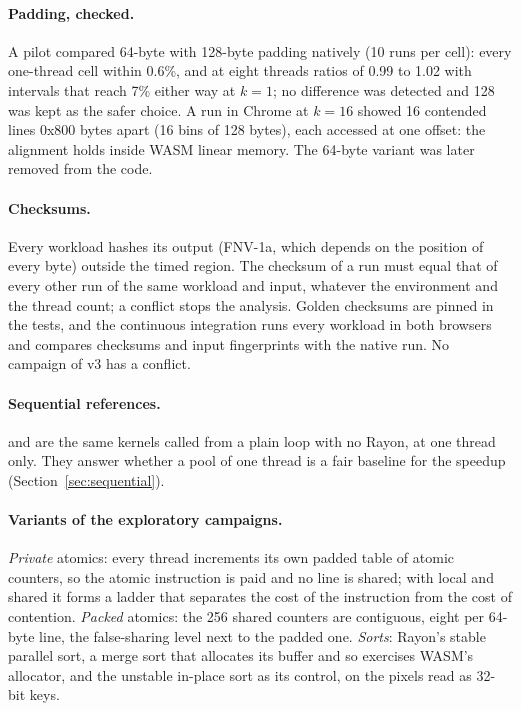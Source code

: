 \paragraph{Padding, checked.} A pilot compared 64-byte with 128-byte padding
natively (10 runs per cell): every one-thread cell within 0.6\%, and at
eight threads ratios of 0.99 to 1.02 with intervals that reach 7\% either
way at $k=1$; no difference was detected and 128 was kept as the safer
choice. A  run in Chrome at $k=16$ showed 16 contended lines
0x800 bytes apart (16 bins of 128 bytes), each accessed at one offset: the
alignment holds inside WASM linear memory. The 64-byte variant was later
removed from the code.

\paragraph{Checksums.} Every workload hashes its output (FNV-1a, which
depends on the position of every byte) outside the timed region. The
checksum of a run must equal that of every other run of the same workload
and input, whatever the environment and the thread count; a conflict stops
the analysis. Golden checksums are pinned in the tests, and the continuous
integration runs every workload in both browsers and compares checksums and
input fingerprints with the native run. No campaign of v3 has a conflict.

\paragraph{Sequential references.}  and  are
the same kernels called from a plain loop with no Rayon, at one thread
only. They answer whether a pool of one thread is a fair baseline for the
speedup (Section~\ref{sec:sequential}).

\paragraph{Variants of the exploratory campaigns.} \emph{Private} atomics:
every thread increments its own padded table of atomic counters, so the
atomic instruction is paid and no line is shared; with local and shared it
forms a ladder that separates the cost of the instruction from the cost of
contention. \emph{Packed} atomics: the 256 shared counters are contiguous,
eight per 64-byte line, the false-sharing level next to the padded one.
\emph{Sorts}: Rayon's stable parallel sort, a merge sort that allocates its
buffer and so exercises WASM's allocator, and the unstable in-place sort as
its control, on the pixels read as 32-bit keys.
